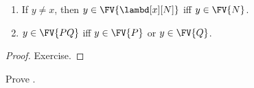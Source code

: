 \documentclass[../../../include/open-logic-section]{subfiles}
\begin{document}
\begin{lem}
  \begin{enumerate}
    \item {} If $y \neq x$, then $y \in
      \FV{\lambd[x][N]}$ iff $y \in \FV{N}$.
    \item {} $y \in \FV{PQ}$ iff $y \in \FV{P}$ or $y
      \in \FV{Q}$.
    \end{enumerate}
\end{lem}

\begin{proof}
  Exercise.
\end{proof}

\begin{prob}
  Prove .
\end{prob}
\end{document}
